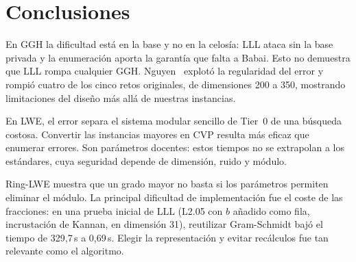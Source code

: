 \clearpage
\section{Conclusiones}
En GGH la dificultad está en la base y no en la celosía: LLL ataca sin la base privada y la
enumeración aporta la garantía que falta a Babai. Esto no demuestra que LLL rompa cualquier GGH. Nguyen~\cite{nguyen} explotó
la regularidad del error y rompió cuatro de los cinco retos originales, de dimensiones 200 a 350,
mostrando limitaciones del diseño más allá de nuestras instancias.

En LWE, el error separa el sistema modular sencillo de Tier~0 de una búsqueda costosa. Convertir
las instancias mayores en CVP resulta más eficaz que enumerar errores. Son parámetros docentes:
estos tiempos no se extrapolan a los estándares, cuya seguridad depende de dimensión, ruido y módulo.

Ring-LWE muestra que un grado mayor no basta si los parámetros permiten eliminar el módulo.
La principal dificultad de implementación fue el coste de las fracciones: en una prueba inicial
de LLL (L2.05 con $b$ añadido como fila, incrustación de Kannan, en dimensión 31), reutilizar Gram-Schmidt bajó el tiempo de
329{,}7\,s a 0{,}69\,s. Elegir la representación y evitar recálculos fue tan relevante como el algoritmo.

